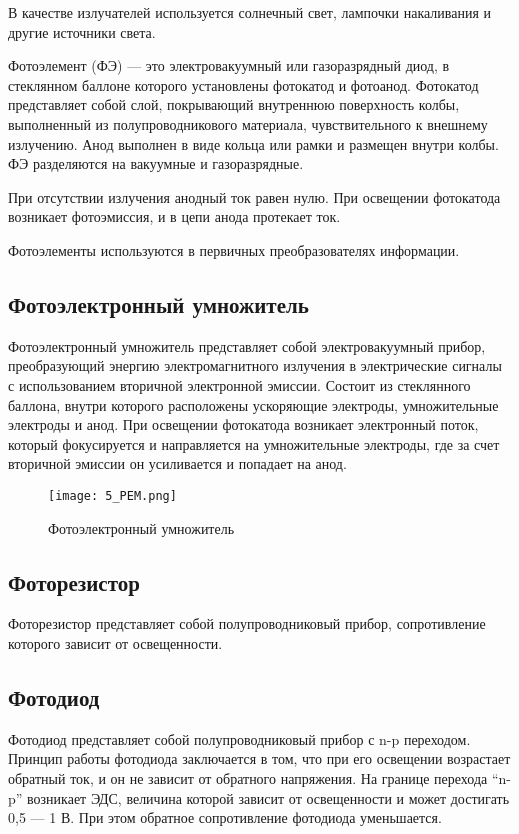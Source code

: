 В качестве излучателей используется солнечный свет, лампочки накаливания и другие источники света.

Фотоэлемент (ФЭ) --- это электровакуумный или газоразрядный диод, в стеклянном баллоне которого установлены фотокатод и фотоанод. Фотокатод представляет собой слой, покрывающий внутреннюю поверхность колбы, выполненный из полупроводникового материала, чувствительного к внешнему излучению. Анод выполнен в виде кольца или рамки и размещен внутри колбы. ФЭ разделяются на вакуумные и газоразрядные.

При отсутствии излучения анодный ток равен нулю. При освещении фотокатода возникает фотоэмиссия, и в цепи анода протекает ток.

Фотоэлементы используются в первичных преобразователях информации.

\subsection*{Фотоэлектронный умножитель}

Фотоэлектронный умножитель представляет собой электровакуумный прибор, преобразующий энергию электромагнитного излучения в электрические сигналы с использованием вторичной электронной эмиссии. Состоит из стеклянного баллона, внутри которого расположены ускоряющие электроды, умножительные электроды и анод. При освещении фотокатода возникает электронный поток, который фокусируется и направляется на умножительные электроды, где за счет вторичной эмиссии он усиливается и попадает на анод.

\begin{figure}[H]
\centering
\texttt{[image: 5\_PEM.png]}
\caption{Фотоэлектронный умножитель}
\label{fig:5_PEM}
\end{figure}

\subsection*{Фоторезистор}

Фоторезистор представляет собой полупроводниковый прибор, сопротивление которого зависит от освещенности.

\subsection*{Фотодиод}

Фотодиод представляет собой полупроводниковый прибор с n-p переходом. Принцип работы фотодиода заключается в том, что при его освещении возрастает обратный ток, и он не зависит от обратного напряжения. На границе перехода “n-p” возникает ЭДС, величина которой зависит от освещенности и может достигать 0,5 --- 1 В. При этом обратное сопротивление фотодиода уменьшается.

